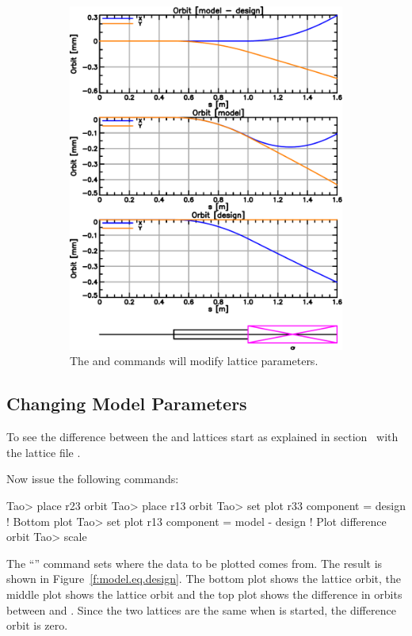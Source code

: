 \documentclass{hitec}
\begin{document}
\begin{figure}[tb]
\begin{subfigure}[b]{0.48\textwidth}
    \includegraphics[width=\textwidth]{changed-model.pdf}
    \caption{The  and  commands will modify  lattice parameters.}
    \label{f:changed.model}
  \end{subfigure}
  \caption{}
\end{figure}

\subsection{Changing Model Parameters}

To see the difference between the  and  lattices start \tao as explained in
section~ with the lattice file .

Now issue the following commands:
\begin{code}
Tao> place r23 orbit
Tao> place r13 orbit
Tao> set plot r33 component = design          ! Bottom plot
Tao> set plot r13 component = model - design  ! Plot difference orbit
Tao> scale
\end{code}
The ``'' command sets where the data to be plotted
comes from.  The result is shown in Figure~\ref{f:model.eq.design}. The bottom plot shows the
 lattice orbit, the middle plot shows the  lattice orbit and the top plot shows
the difference in orbits between  and . Since the two lattices are the same
when \tao is started, the difference orbit is zero.
\end{document}
